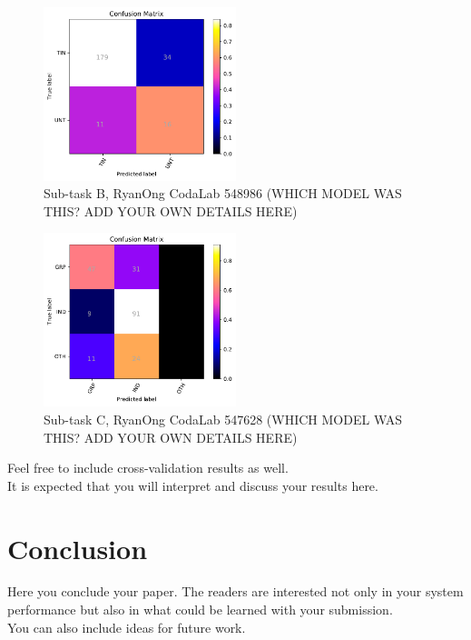 \documentclass[11pt,a4paper]{article}
\begin{document}
\begin{figure}
\centering
\includegraphics[width=0.5\textwidth]{Sub-task_B,_RyanOng_CodaLab_548986.pdf}
\caption{Sub-task B, RyanOng CodaLab 548986 (WHICH MODEL WAS THIS? ADD YOUR OWN DETAILS HERE)}
\label{fig:2}
\end{figure}


\begin{figure}
\centering
\includegraphics[width=0.5\textwidth]{Sub-task_C,_RyanOng_CodaLab_547628.pdf}
\caption{Sub-task C, RyanOng CodaLab 547628 (WHICH MODEL WAS THIS? ADD YOUR OWN DETAILS HERE)}
\label{fig:3}
\end{figure}


\clearpage %


Feel free to include cross-validation results as well.\\

It is expected that you will interpret and discuss your results here.

\section{Conclusion}

Here you conclude your paper. The readers are interested not only in your system performance but also in what could be learned with your submission.\\

You can also include ideas for future work.



\end{document}
